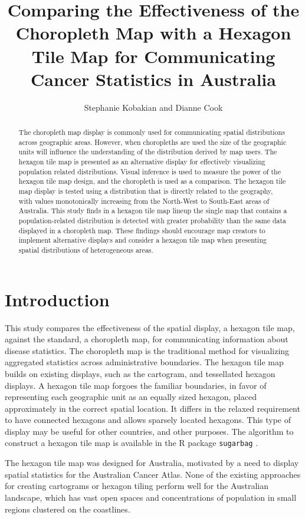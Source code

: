 \documentclass[times, doublespace]{anzsauth}
\title{Comparing the Effectiveness of the Choropleth Map with a Hexagon
Tile Map for Communicating Cancer Statistics in Australia}
\author{Stephanie Kobakian\addressnum{1} and Dianne Cook\addressnum{2}}
\affiliation{Queensland University of Technology and
Monash University}
\date{\vspace{-2.5em}}
\begin{document}
\maketitle
\begin{abstract}
The choropleth map display is commonly used for communicating spatial
distributions across geographic areas. However, when choropleths are
used the size of the geographic units will influence the understanding
of the distribution derived by map users. The hexagon tile map is
presented as an alternative display for effectively visualizing population related
distributions. Visual inference is used to measure the power
of the hexagon tile map design, and the choropleth is used as a
comparison. The hexagon tile map display is tested using a distribution
that is directly related to the geography, with values monotonically
increasing from the North-West to South-East areas of Australia. This
study finds in a hexagon tile map lineup the single map that contains a
population-related distribution is detected with greater probability
than the same data displayed in a choropleth map. These findings should
encourage map creators to implement alternative displays and consider a
hexagon tile map when presenting spatial distributions of heterogeneous
areas.
\end{abstract}

\section{Introduction}\label{introduction}

This study compares the effectiveness of the spatial display, a hexagon
tile map, against the standard, a choropleth map, for communicating
information about disease statistics. The choropleth map is the
traditional method for visualizing aggregated statistics across
administrative boundaries. The hexagon tile map builds on existing
displays, such as the cartogram, and tessellated hexagon displays. A
hexagon tile map forgoes the familiar boundaries, in favor of
representing each geographic unit as an equally sized hexagon, placed
approximately in the correct spatial location. It differs in the relaxed
requirement to have connected hexagons and allows sparsely located
hexagons. This type of display may be useful for other countries, and
other purposes. The algorithm to construct a hexagon tile map is
available in the R package  \texttt{sugarbag} \citep{sugarbag}.

The hexagon tile map was designed for Australia, motivated by a need to
display spatial statistics for the Australian Cancer Atlas. None of the
existing approaches for creating cartograms or hexagon tiling perform
well for the Australian landscape, which has vast open spaces and
concentrations of population in small regions clustered on the
coastlines.
\end{document}
